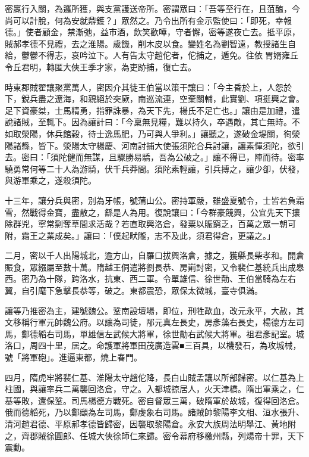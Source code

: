 \begin{pinyinscope}
 密羸行入關，為邏所獲，與支黨護送帝所。密謂眾曰：「吾等至行在，且菹醢，今尚可以計脫，何為安就鼎鑊？」眾然之。乃令出所有金示監使曰：「即死，幸報德。」使者顧金，禁漸弛，益市酒，飲笑歡嘩，守者懈，密等遂夜亡去。抵平原，賊郝孝德不見禮，去之淮陽。歲饑，削木皮以食。變姓名為劉智遠，教授諸生自給，鬱鬱不得志，哀吟泣下。人有告太守趙佗者，佗捕之，遁免。往依胃婿雍丘令丘君明，轉匿大俠王季才家，為吏跡捕，復亡去。



 時東郡賊翟讓聚黨萬人，密因介其徒王伯當以策干讓曰：「今主昏於上，人怨於下，銳兵盡之遼海，和親絕於突厥，南巡流連，空棄關輔，此實劉、項挺興之會。足下資豪桀，士馬精勇，指罪誅暴，為天下先，楊氏不足亡也。」讓由是加禮，遣說諸賊，至輒下。因為讓計曰：「今稟無見糧，難以持久，卒遇敵，其亡無時。不如取滎陽，休兵館穀，待士逸馬肥，乃可與人爭利。」讓聽之，遂破金堤關，徇滎陽諸縣，皆下。滎陽太守楊慶、河南討捕大使張須陀合兵討讓，讓素憚須陀，欲引去。密曰：「須陀健而無謀，且驟勝易驕，吾為公破之。」讓不得已，陣而待。密率驍勇常何等二十人為游騎，伏千兵莽間。須陀素輕讓，引兵搏之，讓少卻，伏發，與游軍乘之，遂殺須陀。



 十三年，讓分兵與密，別為牙帳，號蒲山公。密持軍嚴，雖盛夏號令，士皆若負霜雪，然戰得金寶，盡散之，繇是人為用。復說讓曰：「今群豪競興，公宜先天下攘除群兇，寧常剽奪草間求活哉？若直取興洛倉，發粟以賑窮乏，百萬之眾一朝可附，霜王之業成矣。」讓曰：「僕起畎隴，志不及此，須君得倉，更議之。」



 二月，密以千人出陽城北，逾方山，自羅口拔興洛倉，據之，獲縣長柴孝和。開倉賑食，眾繦屬至數十萬。隋越王侗遣將劉長恭、房崱討密，又令裴仁基統兵出成皋西。密乃為十隊，跨洛水，抗東、西二軍。令單雄信、徐世勣、王伯當騎為左右翼，自引麾下急擊長恭等，破之。東都震恐，眾保太微城，臺寺俱滿。



 讓等乃推密為主，建號魏公。鞏南設壇場，即位，刑牲歃血，改元永平，大赦，其文移稱行軍元帥魏公府。以讓為司徒，邴元真左長史，房彥藻右長史，楊德方左司馬，鄭德韜右司馬，單雄信左武候大將軍，徐世勣右武候大將軍。祖君彥記室。城洛口，周四十里，居之。命護軍將軍田茂廣造雲■三百具，以機發石，為攻城械，號「將軍砲」。進逼東都，燒上春門。



 四月，隋虎牢將裴仁基、淮陽太守趙佗降，長白山賊孟讓以所部歸密。以仁基為上柱國，與讓率兵二萬襲回洛倉，守之。入都城掠居人，火天津橋。隋出軍乘之，仁基等敗，還保鞏。司馬楊德方戰死。密自督眾三萬，破隋軍於故城，復得回洛倉。俄而德韜死，乃以鄭頲為左司馬，鄭虔象右司馬。諸賊帥黎陽李文相、洹水張升、清河趙君德、平原郝孝德皆歸密，因襲取黎陽倉。永安大族周法明舉江、黃地附之，齊郡賊徐圓郎、任城大俠徐師仁來歸。密令幕府移檄州縣，列煬帝十罪，天下震動。




\end{pinyinscope}
